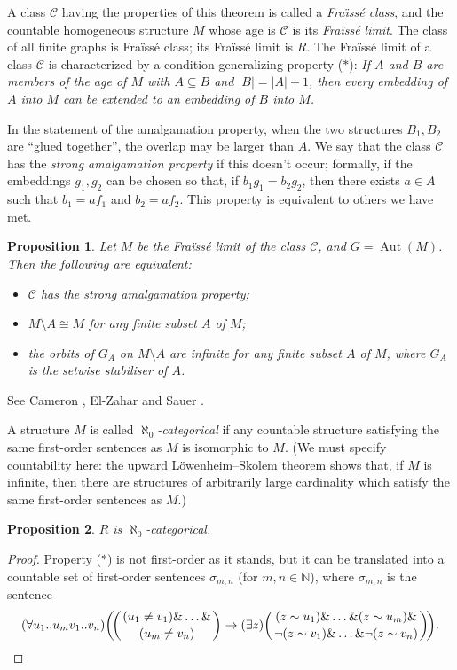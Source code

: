 \documentclass[12pt]{article}
\newtheorem{proposition}{Proposition}
\DeclareMathOperator{\Aut}{Aut}
\begin{document}
A class $\mathcal{C}$ having the properties of this theorem is called
a \emph{Fra\"{\i}ss\'e class}, and the countable homogeneous structure
$M$ whose age is $\mathcal{C}$ is its \emph{Fra\"{i}ss\'{e} limit}. The
class of all finite graphs is Fra\"{i}ss\'{e} class;
its Fra\"{i}ss\'{e} limit is $R$. The Fra\"{i}ss\'{e}
limit of a class $\mathcal{C}$ is characterized by a condition
generalizing property ($\ast$): 
\emph{If $A$ and $B$ are members of the age of $M$ with $A\subseteq B$
and $|B| = |A| + 1$, then every embedding of $A$ into
$M$ can be extended to an embedding of $B$ into $M$.}

In the statement of the amalgamation property, when the two
structures $B_1, B_2$ are ``glued together'', the overlap may be
larger than $A$. We say that the class $\mathcal{C}$ has the
\emph{strong amalgamation property} if this doesn't occur;
formally, if the embeddings $g_1, g_2$ can be chosen so that, if
$b_1g_1 = b_2g_2$, then there exists $a \in A$ such that $b_1 =
af_1$ and $b_2 = af_2$. This property is equivalent to others we
have met.

\begin{proposition}\label{ch32:prop5.2} 
Let $M$ be the Fra\"{i}ss\'{e} limit of the
class $\mathcal{C}$, and $G = \Aut(M)$. Then the following are
equivalent:
\begin{itemize}
\item[(a)] $\mathcal{C}$ has the strong amalgamation property;
\item[(b)] $M \setminus A \cong M$ for any finite subset $A$ of $M$;
\item[(c)] the orbits of $G_A$ on $M \setminus A$ are infinite for any finite subset $A$ of $M$, where $G_A$
is the setwise stabiliser of $A$.
\end{itemize}
\end{proposition}

See Cameron \cite{ch32:bib6}, El-Zahar and Sauer \cite{ch32:bib15}.

A structure $M$ is called \emph{$\aleph_0$-categorical} if any countable
structure satisfying the same first-order sentences as $M$ is
isomorphic to $M$. (We must specify countability here: the upward
L\"{o}wenheim--Skolem theorem shows that, if $M$ is infinite, then
there are structures of arbitrarily large cardinality which satisfy
the same first-order sentences as $M$.)

\begin{proposition}\label{ch32:prop5.3} 
$R$ is $\aleph_0$-categorical.
\end{proposition}
\begin{proof}
Property ($\ast$) is not first-order as it stands,
but it can be translated into a countable set of first-order
sentences $\sigma_{m,n}$ (for $m, n \in \mathbb{N}$), where
$\sigma_{m,n}$ is the sentence
\[
(\forall u_1..u_mv_1..v_n)\bigg(\!\bigg({(u_1\neq
v_1)\& \ldots \& \atop (u_m \neq v_n)}\bigg)\rightarrow
(\exists z)\bigg({(z\sim u_1)\& \ldots \& (z\sim
u_m)\& \atop \neg(z\sim v_1)\& \ldots \& \neg(z\sim
v_n)}\bigg)\!\bigg).\qedhere
\]
\end{proof}
\end{document}
